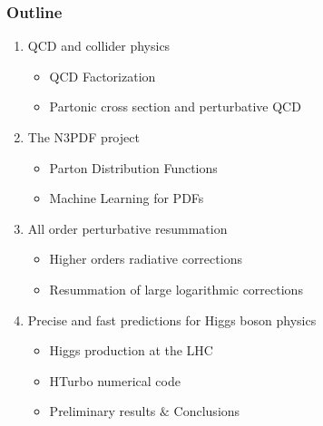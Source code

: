\documentclass[aspectratio=43]{beamer}
\begin{document}
\begin{frame}

	\frametitle{Outline}
	
	\begin{enumerate}
		\item {\color{blue}QCD and collider physics}
		\begin{itemize}
			\item QCD Factorization
			\item Partonic cross section and perturbative QCD
		\end{itemize}
		\item {\color{blue}The N3PDF project}
		\begin{itemize}	
			\item Parton Distribution Functions
			\item Machine Learning for PDFs
		\end{itemize}	
		\item {\color{blue}All order perturbative resummation}
		\begin{itemize}
			\item Higher orders radiative corrections
			\item Resummation of large logarithmic corrections
		\end{itemize}
		\item {\color{blue}Precise and fast predictions for Higgs boson physics}
		\begin{itemize}
			\item Higgs production at the LHC
			\item HTurbo numerical code
			\item Preliminary results $\&$ Conclusions
		\end{itemize}
	\end{enumerate}
	
\end{frame}

\begin{frame}


\end{frame}
\end{document}
